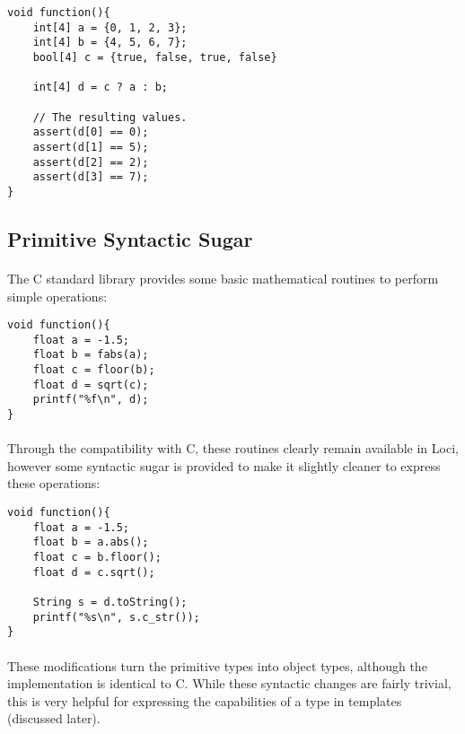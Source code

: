 \documentclass[12pt,twoside,notitlepage]{report}
\begin{document}
\small{
\begin{verbatim}
void function(){
    int[4] a = {0, 1, 2, 3};
    int[4] b = {4, 5, 6, 7};
    bool[4] c = {true, false, true, false}
    
    int[4] d = c ? a : b;
    
    // The resulting values.
    assert(d[0] == 0);
    assert(d[1] == 5);
    assert(d[2] == 2);
    assert(d[3] == 7);
}
\end{verbatim}
}

\subsection{Primitive Syntactic Sugar}

\paragraph{}
The C standard library provides some basic mathematical routines to perform simple operations:

\small{
\begin{verbatim}
void function(){
    float a = -1.5;
    float b = fabs(a);
    float c = floor(b);
    float d = sqrt(c);
    printf("%f\n", d);
}
\end{verbatim}
}

\paragraph{}
Through the compatibility with C, these routines clearly remain available in Loci, however some syntactic sugar is provided to make it slightly cleaner to express these operations:

\small{
\begin{verbatim}
void function(){
    float a = -1.5;
    float b = a.abs();
    float c = b.floor();
    float d = c.sqrt();
    
    String s = d.toString();
    printf("%s\n", s.c_str());
}
\end{verbatim}
}

\paragraph{}
These modifications turn the primitive types into object types, although the implementation is identical to C. While these syntactic changes are fairly trivial, this is very helpful for expressing the capabilities of a type in templates (discussed later).
\end{document}
